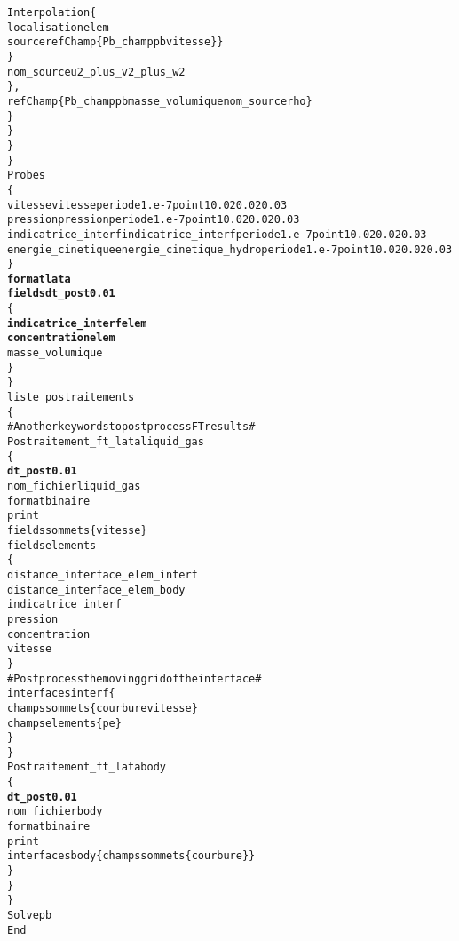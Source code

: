 \begin{alltt}
                                Interpolation \{
                                    localisation elem
                                    source refChamp \{ Pb_champ pb vitesse \} \}
                            \}
                            nom_source u2_plus_v2_plus_w2
                        \} ,
                        refChamp \{ Pb_champ pb masse_volumique nom_source rho \}
                    \}
                \}
            \}
        \}
        Probes 
        \{
            vitesse vitesse periode 1.e-7 point 1 0.02 0.02 0.03
            pression pression periode 1.e-7 point 1 0.02 0.02 0.03
            indicatrice_interf indicatrice_interf periode 1.e-7 point 1 0.02 0.02 0.03
            energie_cinetique energie_cinetique_hydro periode 1.e-7 point 1 0.02 0.02 0.03
        \}
        {\bf{format lata}}
        {\bf{fields dt_post 0.01 }}
        \{
            {\bf{indicatrice_interf elem}}
            {\bf{concentration elem}}
            masse_volumique
        \}
    \}
    liste_postraitements
    \{
        # Another keywords to post process FT results #
        Postraitement_ft_lata liquid_gas
        \{
            {\bf{dt_post 0.01 }}
            nom_fichier liquid_gas
            format binaire
            print
            fields sommets \{ vitesse \}
            fields elements
            \{
                distance_interface_elem_interf
                distance_interface_elem_body
                indicatrice_interf
                pression
                concentration
                vitesse
            \}
            # Post process the moving grid of the interface #
            interfaces interf \{
                champs sommets \{ courbure vitesse \}
                champs elements \{ pe \}
            \}
        \}
        Postraitement_ft_lata body
        \{
            {\bf{dt_post 0.01 }}
            nom_fichier body
            format binaire
            print
            interfaces body \{ champs sommets \{ courbure \} \}
        \}
    \}
\}
Solve pb
End
\end{alltt}
